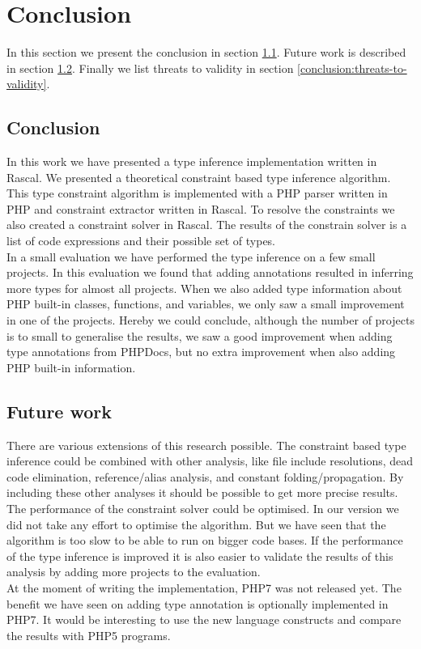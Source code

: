 \documentclass[main.tex]{subfiles}
\begin{document}
    \chapter{Conclusion}\label{ch:conclusion}
    In this section we present the conclusion in section \ref{conclusion:conclusion}.
    Future work is described in section \ref{conclusion:future-work}.
    Finally we list threats to validity in section \ref{conclusion:threats-to-validity}.
    
    \section{Conclusion}\label{conclusion:conclusion}
    In this work we have presented a type inference implementation written in Rascal.
    We presented a theoretical constraint based type inference algorithm.
    This type constraint algorithm is implemented with a PHP parser written in PHP and constraint extractor written in Rascal.
    To resolve the constraints we also created a constraint solver in Rascal.
    The results of the constrain solver is a list of code expressions and their possible set of types.
    \\
    In a small evaluation we have performed the type inference on a few small projects.
    In this evaluation we found that adding annotations resulted in inferring more types for almost all projects.
    When we also added type information about PHP built-in classes, functions, and variables, we only saw a small improvement in one of the projects.
    Hereby we could conclude, although the number of projects is to small to generalise the results, we saw a good improvement when adding type annotations from PHPDocs, but no extra improvement when also adding PHP built-in information.
    
    \section{Future work}\label{conclusion:future-work}
    There are various extensions of this research possible.
    The constraint based type inference could be combined with other analysis, like file include resolutions, dead code elimination, reference/alias analysis, and constant folding/propagation.
    By including these other analyses it should be possible to get more precise results.
    \\
    The performance of the constraint solver could be optimised.
    In our version we did not take any effort to optimise the algorithm.
    But we have seen that the algorithm is too slow to be able to run on bigger code bases.
    If the performance of the type inference is improved it is also easier to validate the results of this analysis by adding more projects to the evaluation.
    \\
    At the moment of writing the implementation, PHP7 was not released yet.
    The benefit we have seen on adding type annotation is optionally implemented in PHP7.
    It would be interesting to use the new language constructs and compare the results with PHP5 programs.
    
\end{document}

